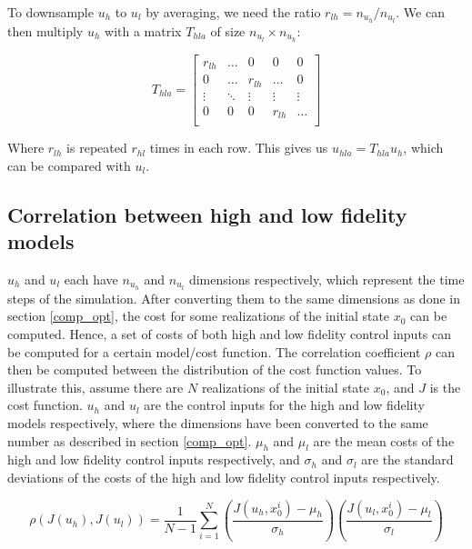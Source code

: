\documentclass{article}
\begin{document}
To downsample $u_h$ to $u_l$ by averaging, we need the ratio $r_{lh} = n_{u_h} / n_{u_l}$.
We can then multiply $u_h$ with a matrix $T_{hla}$ of size $n_{u_l} \times n_{u_h}$:

\begin{equation}
  T_{hla} =
  \begin{bmatrix}
    r_{lh} & \ldots & 0 & 0 & 0 \\
    0 & \ldots & r_{lh} & \ldots & 0 \\
    \vdots & \ddots & \vdots & \vdots & \vdots \\
    0 & 0 & 0 & r_{lh} & \ldots \\
  \end{bmatrix}
\end{equation}

Where $r_{lh}$ is repeated $r_{hl}$ times in each row.
This gives us $u_{hla} = T_{hla} u_h$, which can be compared with $u_l$.

\subsection{Correlation between high and low fidelity models}

$u_h$ and $u_l$ each have $n_{u_h}$ and $n_{u_l}$ dimensions respectively, which represent the time steps of the simulation.
After converting them to the same dimensions as done in section \ref{comp_opt},
the cost for some realizations of the initial state $x_0$ can be computed.
Hence, a set of costs of both high and low fidelity control inputs can be computed for a certain model/cost function.
The correlation coefficient $\rho$ can then be computed between the distribution of the cost function values.
To illustrate this, assume there are $N$ realizations of the initial state $x_0$, and $J$ is the cost function.
$u_h$ and $u_l$ are the control inputs for the high and low fidelity models respectively, where the dimensions have been
converted to the same number as described in section \ref{comp_opt}. $\mu_h$ and $\mu_l$ are the mean costs
of the high and low fidelity control inputs respectively, and $\sigma_h$ and $\sigma_l$ are the standard deviations of
the costs of the high and low fidelity control inputs respectively.

\begin{equation}
  \rho(J(u_h), J(u_l)) = \frac{1}{N-1} \sum_{i=1}^{N} \left( \frac{J(u_h, x_0^i) - \mu_h}{\sigma_h} \right) \left( \frac{J(u_l, x_0^i) - \mu_l}{\sigma_l} \right)
\end{equation}
\end{document}
